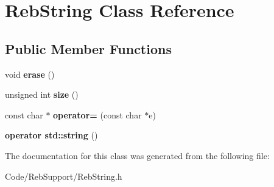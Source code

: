 \hypertarget{class_reb_string}{}\section{Reb\+String Class Reference}
\label{class_reb_string}
\subsection*{Public Member Functions}
\begin{DoxyCompactItemize}
\item 
void {\bfseries erase} ()\hypertarget{class_reb_string_a165420c3968df1ed93906c88c97188aa}{}\label{class_reb_string_a165420c3968df1ed93906c88c97188aa}

\item 
unsigned int {\bfseries size} ()\hypertarget{class_reb_string_a0c7426931abfa62f948669aefad86784}{}\label{class_reb_string_a0c7426931abfa62f948669aefad86784}

\item 
const char $\ast$ {\bfseries operator=} (const char $\ast$e)\hypertarget{class_reb_string_a1c1e6cf82626c9a96ded348103e09a09}{}\label{class_reb_string_a1c1e6cf82626c9a96ded348103e09a09}

\item 
{\bfseries operator std\+::string} ()\hypertarget{class_reb_string_a96e7c3cf15792aea3fc07218510aba1a}{}\label{class_reb_string_a96e7c3cf15792aea3fc07218510aba1a}

\end{DoxyCompactItemize}


The documentation for this class was generated from the following file\+:\begin{DoxyCompactItemize}
\item 
Code/\+Reb\+Support/Reb\+String.\+h\end{DoxyCompactItemize}

